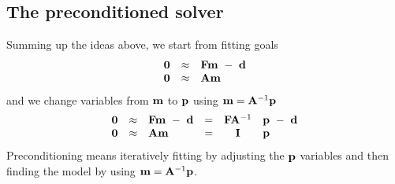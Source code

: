 \subsection{The preconditioned solver}
Summing up the ideas above,
we start from fitting goals
\begin{equation}
\begin{array}{lll}
\label{eq:main}
\bold 0 &\approx& \bold F \bold m \ -\  \bold d \\
\bold 0 &\approx& \bold A \bold m
\end{array}
\end{equation}
and we change variables from
$\bold m$ to $\bold p$ using
$\bold m = \bold A^{-1} \bold p$
\begin{equation}
\begin{array}{llllcl}
\bold 0 &\approx &  \bold F \bold m \ -\  \bold d   &=&
    \bold F  \bold A^{-1} &\bold p  \ -\  \bold d
\\
\bold 0 &\approx &  \bold A \bold m       &=&   \bold I        & \bold p
\end{array}
\label{eqn:precsummary}
\end{equation}
Preconditioning means iteratively fitting
by adjusting the $\bold p$ variables
and then finding the model by using
$\bold m = \bold A^{-1} \bold p$.

\begin{comment}
A new reusable
preconditioned solver is
the module \texttt{solver_prc} \vpageref{lst:solver_prc}.
Likewise the modeling operator $\bold F$ is called \texttt{Fop}
and the smoothing operator $\bold A^{-1}$ is called \texttt{Sop}.
Details of the code are only slightly different from
the regularized solver
\texttt{solver_reg} \vpageref{lst:solver_reg}.

\moddex{solver_prc}{Preconditioned solver}
\end{comment}


